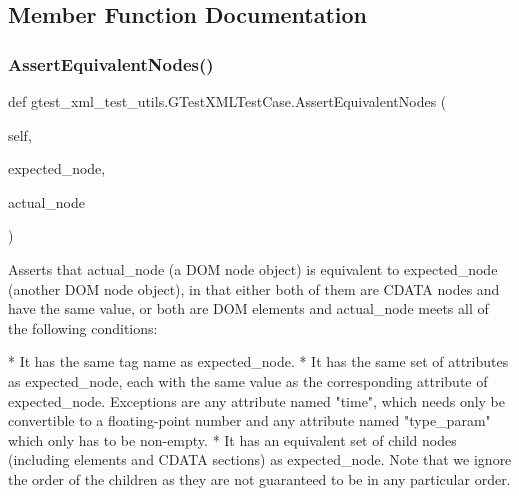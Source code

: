\subsection{Member Function Documentation}
\mbox{\label{classgtest__xml__test__utils_1_1GTestXMLTestCase_a977273e8863f4f41d121bb5a64b08d32}} 
\subsubsection{\texorpdfstring{AssertEquivalentNodes()}{AssertEquivalentNodes()}}
{\footnotesize\ttfamily def gtest\+\_\+xml\+\_\+test\+\_\+utils.\+G\+Test\+X\+M\+L\+Test\+Case.\+Assert\+Equivalent\+Nodes (\begin{DoxyParamCaption}\item[{}]{self,  }\item[{}]{expected\+\_\+node,  }\item[{}]{actual\+\_\+node }\end{DoxyParamCaption})}

\begin{DoxyVerb}Asserts that actual_node (a DOM node object) is equivalent to
expected_node (another DOM node object), in that either both of
them are CDATA nodes and have the same value, or both are DOM
elements and actual_node meets all of the following conditions:

*  It has the same tag name as expected_node.
*  It has the same set of attributes as expected_node, each with
   the same value as the corresponding attribute of expected_node.
   Exceptions are any attribute named "time", which needs only be
   convertible to a floating-point number and any attribute named
   "type_param" which only has to be non-empty.
*  It has an equivalent set of child nodes (including elements and
   CDATA sections) as expected_node.  Note that we ignore the
   order of the children as they are not guaranteed to be in any
   particular order.
\end{DoxyVerb}
 \mbox{\label{classgtest__xml__test__utils_1_1GTestXMLTestCase_ac4823e96c3b5327b25a340a3605447d9}} 
